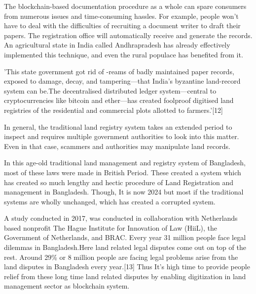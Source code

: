 \documentclass[conference]{IEEEtran}
\begin{document}
The blockchain-based documentation procedure as a whole can spare consumers from numerous issues and time-consuming hassles. For example, people won't have to deal with the difficulties of recruiting a document writer to draft their papers. The registration office will automatically receive and generate the records. An agricultural state in India called Andhrapradesh has already effectively implemented this technique, and even the rural populace has benefited from it.

'This state government got rid of -reams of badly maintained paper records, exposed to damage, decay, and tampering—that India's byzantine land-record system can be.The decentralised distributed ledger system—central to cryptocurrencies like bitcoin and ether—has created foolproof digitised land registries of the residential and commercial plots allotted to farmers.'[12]

In general, the traditional land registry system takes an extended period to inspect and requires multiple government authorities to look into this matter. Even in that case, scammers and authorities may manipulate land records.


In this age-old traditional land management and registry system of Bangladesh, most of these laws were made in British Period. These created a system which has created so much lengthy and hectic procedure of Land Registration and management in Bangladesh. Though, It is now 2024 but most if the traditional systems are wholly  unchanged, which has created a corrupted system.

 A study conducted in 2017, was conducted in collaboration with Netherlands based nonprofit The Hague Institute for Innovation of Law (HiiL), the Government of Netherlands, and BRAC. Every year  31 million people face legal dilemmas in Bangladesh.Here land related legal disputes come out on top of the rest. Around 29\% or 8 million people are facing legal problems arise from the land disputes in Bangladesh every year.[13] Thus It's high time to provide people relief from these long time land related disputes by enabling  digitization in land management sector as blockchain system. \\
\end{document}
